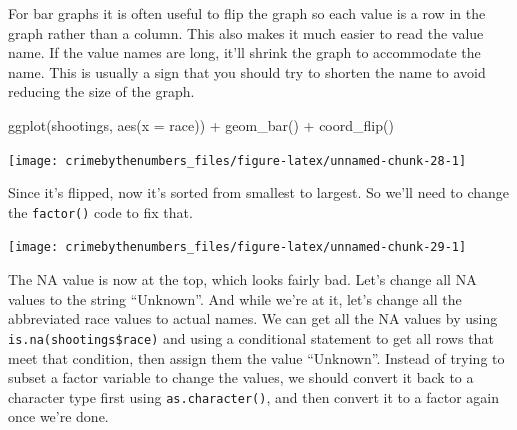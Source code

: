 \documentclass[
  12pt,
]{book}
\newenvironment{Shaded}{\begin{snugshade}}{\end{snugshade}}
\newcommand{\AttributeTok}[1]{\textcolor[rgb]{0.61,0.61,0.61}{#1}}
\newcommand{\ConstantTok}[1]{\textcolor[rgb]{0,0,0}{#1}}
\newcommand{\FunctionTok}[1]{\textcolor[rgb]{0,0,0}{#1}}
\newcommand{\NormalTok}[1]{#1}
\newcommand{\OtherTok}[1]{\textcolor[rgb]{0.37,0.37,0.37}{#1}}
\newcommand{\SpecialCharTok}[1]{\textcolor[rgb]{0,0,0}{#1}}
\begin{document}
For bar graphs it is often useful to flip the graph so each value is a row in the graph rather than a column. This also makes it much easier to read the value name. If the value names are long, it'll shrink the graph to accommodate the name. This is usually a sign that you should try to shorten the name to avoid reducing the size of the graph.

\begin{Shaded}
\begin{Highlighting}[]
\FunctionTok{ggplot}\NormalTok{(shootings, }\FunctionTok{aes}\NormalTok{(}\AttributeTok{x =}\NormalTok{ race)) }\SpecialCharTok{+} 
  \FunctionTok{geom\_bar}\NormalTok{() }\SpecialCharTok{+}
  \FunctionTok{coord\_flip}\NormalTok{() }
\end{Highlighting}
\end{Shaded}

\begin{center}\texttt{[image: crimebythenumbers\_files/figure-latex/unnamed-chunk-28-1]} \end{center}

Since it's flipped, now it's sorted from smallest to largest. So we'll need to change the \texttt{factor()} code to fix that.

\begin{Shaded}
\end{Shaded}

\begin{center}\texttt{[image: crimebythenumbers\_files/figure-latex/unnamed-chunk-29-1]} \end{center}

The NA value is now at the top, which looks fairly bad. Let's change all NA values to the string ``Unknown''. And while we're at it, let's change all the abbreviated race values to actual names. We can get all the NA values by using \texttt{is.na(shootings\$race)} and using a conditional statement to get all rows that meet that condition, then assign them the value ``Unknown''. Instead of trying to subset a factor variable to change the values, we should convert it back to a character type first using \texttt{as.character()}, and then convert it to a factor again once we're done.
\end{document}
